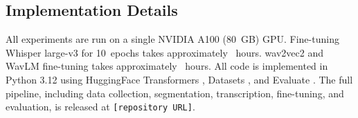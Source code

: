 \subsection{Implementation Details}

All experiments are run on a single NVIDIA A100 (80~GB) GPU.
Fine-tuning Whisper large-v3 for 10~epochs takes approximately ~hours.
wav2vec2 and WavLM fine-tuning takes approximately ~hours.
All code is implemented in Python 3.12 using HuggingFace
Transformers \citep{wolf2020transformers},
Datasets \citep{lhoest2021datasets},
and Evaluate \citep{evaluate2022}.
The full pipeline, including data collection, segmentation, transcription,
fine-tuning, and evaluation, is released at \texttt{[repository URL]}.
